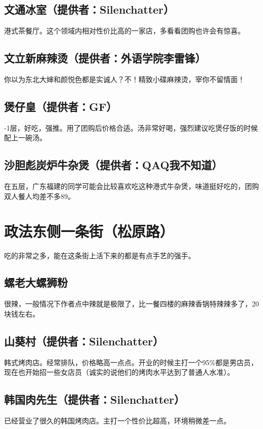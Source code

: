 \documentclass[lang=cn,color=blue,12pt,scheme=chinese,chinesefont=nofont]{elegantbook}
\begin{document}
\subsection{文通冰室（提供者：Silenchatter）}
港式茶餐厅。这个领域内相对性价比高的一家店，多看看团购也许会有惊喜。

\subsection{文立新麻辣烫（提供者：外语学院李雷锋）}
你以为东北大婶和颜悦色都是实诚人？不！精致小碟麻辣烫，宰你不留情面！

\subsection{煲仔皇（提供者：GF）}
-1层，好吃，强推。用了团购后价格合适。汤非常好喝，强烈建议吃煲仔饭的时候配上一碗汤。

\subsection{沙胆彪炭炉牛杂煲（提供者：QAQ我不知道）}
在五层，广东福建的同学可能会比较喜欢吃这种港式牛杂煲，味道挺好吃的，团购双人餐人均差不多89。

\section{政法东侧一条街（松原路）}
\setlength{\parindent}{2em}
吃的非常之多，能在这条街上活下来的都是有点手艺的强手。

\subsection{螺老大螺狮粉}
很辣，一般情况下作者点中辣就是极限了，比一餐四楼的麻辣香锅特辣辣多了，20块钱左右。

\subsection{山葵村（提供者：Silenchatter）}
韩式烤肉店。经常排队，价格略高一点点。开业的时候主打一个95\%都是男店员，现在也开始招一些女店员（诚实的说他们的烤肉水平达到了普通人水准）。

\subsection{韩国肉先生（提供者：Silenchatter）}
已经营业了很久的韩国烤肉店。主打一个性价比超高，环境稍微差一点。
\end{document}
